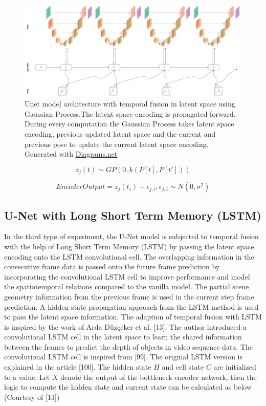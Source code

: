 	\begin{figure}
		\centering
		\includegraphics[width=14cm]{images/unet_gp.png}
		\caption{Unet model architecture with temporal fusion in latent space using Gaussian Process.The latent space encoding is propagated forward. During every computation the Gaussian Process takes latent space encoding, previous updated latent space and the current and previous pose to update the current latent space encoding. Generated with \href{https://app.diagrams.net/}{Diagrams.net}}
		\label{fig:unet_gp}
	\end{figure}

	\begin{equation}
		z_j(t) \sim GP(0, k(P[t], P[t']))
		\label{eq:gp}
	\end{equation}
	
	\begin{equation}
		EncoderOutput = z_j(t_i)+ \epsilon_{j,i}, \epsilon_{j,i} \sim  N(0, \sigma^2)
		\label{eq:encode_output}
	\end{equation}
    
    
    \subsection{U-Net with Long Short Term Memory (LSTM)}
    
    In the third type of experiment, the U-Net model is subjected to temporal fusion with the help of Long Short Term Memory (LSTM) by passing the latent space encoding onto the LSTM convolutional cell. The overlapping information in the consecutive frame data is passed onto the future frame prediction by incorporating the convolutional LSTM cell to improve performance and model the spatiotemporal relations compared to the vanilla model. The partial scene geometry information from the previous frame is used in the current step frame prediction. A hidden state propagation approach from the LSTM method is used to pass the latent space information. The adaption of temporal fusion with LSTM is inspired by the work of Arda Düzçeker et al. [13]. The author introduced a convolutional LSTM cell in the latent space to learn the shared information between the frames to predict the depth of objects in video sequence data. The convolutional LSTM cell is inspired from [99]. The original LSTM version is explained in the article [100]. The hidden state $H$ and cell state $C$ are initialized to a value. Let $X$ denote the output of the bottleneck encoder network, then the logic to compute the hidden state and current state can be calculated as below (Courtesy of [13])
    
